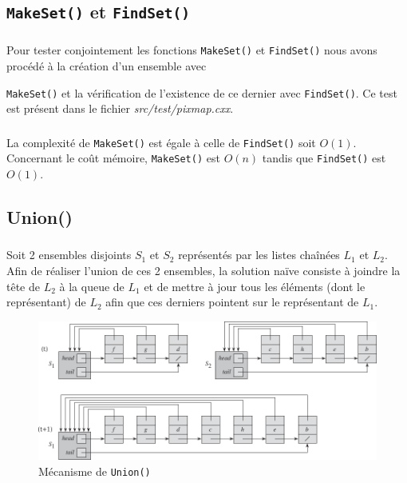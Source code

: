 \documentclass[10pt,a4paper]{article}
\begin{document}
\subsection{\texttt{MakeSet()} et \texttt{FindSet()}}

\subsubsection{}
Pour tester conjointement les fonctions \texttt{MakeSet()} et \texttt{FindSet()} nous avons procédé à la création d'un ensemble avec {\texttt{MakeSet()} et la vérification de l'existence de ce dernier avec \texttt{FindSet()}.
Ce test est présent dans le fichier \textit{src/test/pixmap.cxx}.

\subsubsection{} \label{2.2}
La complexité de \texttt{MakeSet()} est égale à celle de \texttt{FindSet()} soit $O(1)$.
Concernant le co\^ut mémoire, \texttt{MakeSet()} est $O(n)$ tandis que \texttt{FindSet()} est $O(1)$.

\subsection{Union()}
\subsubsection{} \label{3.1}
Soit 2 ensembles disjoints $S_{1}$ et $S_{2}$ représentés par les listes chaînées $L_{1}$ et $L_{2}$. Afin de réaliser l'union de ces 2 ensembles, la solution naïve consiste à joindre la tête de $L_{2}$ à la queue de $L_{1}$ et de mettre à jour tous les éléments (dont le représentant) de $L_{2}$ afin que ces derniers pointent sur le représentant de $L_{1}$.

\begin{figure}[h]
\centering
\includegraphics{3-1.pdf}
\caption{Mécanisme de \texttt{Union()}}
\end{figure}

}
\end{document}
